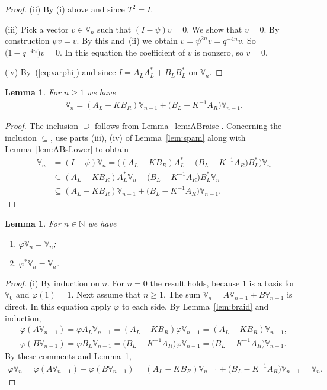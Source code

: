 \documentclass[11pt]{article}
\numberwithin{equation}{section}
\numberwithin{equation}{section}
\newtheorem{Lemma}[Theorem]{Lemma}
\begin{document}
{\begin{proof}
(ii) By (i) above and since $T^2=I$.

(iii) Pick a vector $v\in \mathbb V_n$ such that $(I-\psi)v=0$. We show that $v=0$. By construction $\psi v = v$. By this and~(ii) we obtain $v=\psi^{2n}v = q^{-4n} v$. So $\big(1-q^{-4n}\big)v=0$. In this equation the coefficient of $v$ is nonzero, so $v=0$.

(iv) By~(\ref{eq:varphi}) and since $I = A_L A^*_L + B_L B^*_L$ on $\mathbb V_n$.
\end{proof}

\begin{Lemma}\label{lem:span} For $n\geq 1$ we have
\begin{gather*}
\mathbb V_n = (A_L - K B_R)\mathbb V_{n-1} + \big(B_L-K^{-1} A_R\big)\mathbb V_{n-1}.%
\end{gather*}
\end{Lemma}
\begin{proof}The inclusion $\supseteq $ follows from Lemma~\ref{lem:ABraise}. Concerning the inclusion $\subseteq$, use parts (iii), (iv) of Lemma~\ref{lem:spam} along with Lemma~\ref{lem:ABsLower} to obtain
\begin{align*}
\mathbb V_n &= (I-\psi)\mathbb V_n =\bigl((A_L-K B_R)A^*_L+ \big(B_L-K^{-1} A_R\big)B^*_L\bigr) \mathbb V_n\\
&\subseteq(A_L-K B_R)A^*_L \mathbb V_n + \big(B_L-K^{-1} A_R\big)B^*_L\mathbb V_n\\
&\subseteq (A_L-K B_R) \mathbb V_{n-1}+ \big(B_L-K^{-1} A_R\big) \mathbb V_{n-1}.\tag*{\qed}
\end{align*}\renewcommand{\qed}{}
\end{proof}

\begin{Lemma}\label{lem:qroot}For $n \in \mathbb N$ we have
\begin{enumerate}\itemsep=0pt
\item[\rm (i)]
 $\varphi \mathbb V_n = \mathbb V_n$;
\item[\rm (ii)]
 $\varphi^* \mathbb V_n = \mathbb V_n$.
 \end{enumerate}
\end{Lemma}
\begin{proof}(i) By induction on $n$. For $n=0$ the result holds, because $1$ is a basis for $\mathbb V_0$ and $\varphi(1)=1$. Next assume that $n\geq 1$. The sum $\mathbb V_n= A \mathbb V_{n-1} + B \mathbb V_{n-1}$ is direct. In this equation apply $\varphi$ to each side. By Lemma~\ref{lem:braid} and induction,
\begin{gather*}
\varphi (A \mathbb V_{n-1})=\varphi A_L \mathbb V_{n-1}= (A_L - K B_R)\varphi \mathbb V_{n-1}
= (A_L - K B_R)\mathbb V_{n-1}, \\
\varphi (B \mathbb V_{n-1}) =\varphi B_L \mathbb V_{n-1} = \big(B_L - K^{-1} A_R\big)\varphi \mathbb V_{n-1}
= \big(B_L - K^{-1} A_R\big)\mathbb V_{n-1}.
\end{gather*}
By these comments and Lemma~\ref{lem:span},
\begin{gather*}
\varphi \mathbb V_n =\varphi (A \mathbb V_{n-1}) + \varphi (B \mathbb V_{n-1})
= (A_L - K B_R)\mathbb V_{n-1} +\big(B_L - K^{-1} A_R\big)\mathbb V_{n-1} = \mathbb V_n.
\end{gather*}


\end{proof}}
\end{document}
